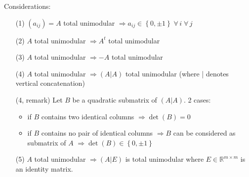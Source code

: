\documentclass{article}
\newcommand{\set}[1]{\left\{#1\right\}}
\newcommand{\fall}{\;\forall\,}
\begin{document}
Considerations:
\begin{enumerate}
  \item[(1)] $(a_{ij}) = A$ total unimodular $\Rightarrow a_{ij} \in \set{0,\pm 1} \fall i \fall j$
  \item[(2)] $A$ total unimodular $\Rightarrow A^t$ total unimodular
  \item[(3)] $A$ total unimodular $\Rightarrow -A$ total unimodular
  \item[(4)] $A$ total unimodular $\Rightarrow (A | A)$ total unimodular (where | denotes vertical concatenation)
  \item[(4, remark)]
    Let $B$ be a quadratic submatrix of $(A | A)$. 2 cases:
    \begin{itemize}
      \item if $B$ contains two identical columns $\Rightarrow \det(B) = 0$
      \item if $B$ contains no pair of identical columns
        $\Rightarrow B$ can be considered as submatrix of $A$
        $\Rightarrow \det(B) \in \set{0, \pm 1}$
    \end{itemize}

  \item[(5)]
    $A$ total unimodular $\Rightarrow (A | E)$ is total unimodular where $E \in \mathbb{R}^{m\times m}$ is an identity matrix.


\end{enumerate}
\end{document}
